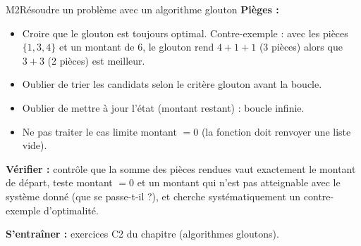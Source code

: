 \begin{fichemethode}{M2}{Résoudre un problème avec un algorithme glouton}
\textbf{Pièges :}
\begin{itemize}
  \item Croire que le glouton est toujours optimal. Contre-exemple : avec les
    pièces $\{1, 3, 4\}$ et un montant de 6, le glouton rend $4 + 1 + 1$
    (3 pièces) alors que $3 + 3$ (2 pièces) est meilleur.
  \item Oublier de trier les candidats selon le critère glouton avant la boucle.
  \item Oublier de mettre à jour l'état (montant restant) : boucle infinie.
  \item Ne pas traiter le cas limite montant $= 0$ (la fonction doit renvoyer une liste vide).
\end{itemize}

\textbf{Vérifier :} contrôle que la somme des pièces rendues vaut exactement le montant de départ, teste montant $= 0$ et un montant qui n'est pas atteignable avec le système donné (que se passe-t-il ?), et cherche systématiquement un contre-exemple d'optimalité.

\textbf{S'entraîner :} exercices C2 du chapitre (algorithmes gloutons).
\end{fichemethode}
